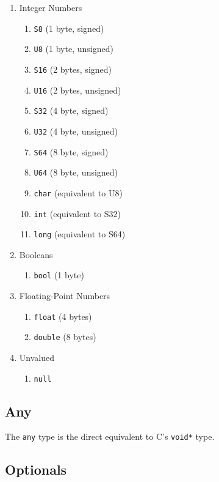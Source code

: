 \documentclass[12pt]{article}
\begin{document}
\begin{enumerate}
	\item Integer Numbers
	\begin{enumerate}
		\item \lstinline!S8! (1 byte, signed)
		\item \lstinline!U8! (1 byte, unsigned)
		\item \lstinline!S16! (2 bytes, signed)
		\item \lstinline!U16! (2 bytes, unsigned)
		\item \lstinline!S32! (4 byte, signed)
		\item \lstinline!U32! (4 byte, unsigned)
		\item \lstinline!S64! (8 byte, signed)
		\item \lstinline!U64! (8 byte, unsigned)
		\item \lstinline!char! (equivalent to U8)
		\item \lstinline!int! (equivalent to S32)
		\item \lstinline!long! (equivalent to S64)
	\end{enumerate}
	\item Booleans
	\begin{enumerate}
		\item \lstinline!bool! (1 byte)
	\end{enumerate}
	\item Floating-Point Numbers
	\begin{enumerate}
		\item \lstinline!float! (4 bytes)
		\item \lstinline!double! (8 bytes)
	\end{enumerate}
	\item Unvalued
	\begin{enumerate}
		\item \lstinline!null!
	\end{enumerate}
\end{enumerate}

\subsection{Any}

The \lstinline!any! type is the direct equivalent to C's \lstinline!void*! type.

\subsection{Optionals}
\end{document}
